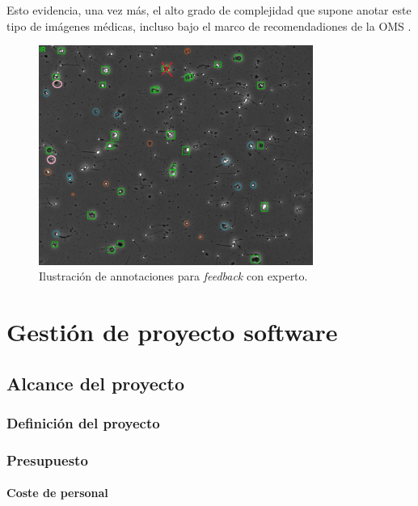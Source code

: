 \documentclass[12pt,a4paper,onecolumn,oneside]{report}
\begin{document}
Esto evidencia, una vez más, el alto grado de complejidad que supone anotar este tipo de imágenes médicas, incluso bajo el marco de recomendadiones de la OMS \cite{OMS} \cite{BJBS}.

\begin{figure}[htbp]
  \centering
  \includegraphics[width=0.8\textwidth]{figuras/rounds_cells/feedback_experto.png}
  \caption{Ilustración de annotaciones para \textit{feedback} con experto.}
  \label{fig:feedback_experto}
\end{figure}

\chapter{Gestión de proyecto software} %
\label{Gestión de proyecto software}

\section{Alcance del proyecto}
\label{Alcance del proyecto}

\subsection{Definición del proyecto}

\subsection{Presupuesto}

\subsubsection{Coste de personal}
\end{document}
